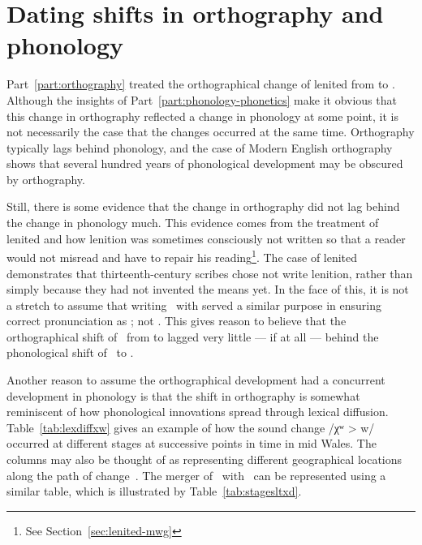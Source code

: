 \section{Dating shifts in orthography and phonology}
\label{sec:change-lenition-as}

Part~\ref{part:orthography} treated the orthographical change of lenited  from  to . Although the insights of Part~\ref{part:phonology-phonetics} make it obvious that this change in orthography reflected a change in phonology at some point, it is not necessarily the case that the changes occurred at the same time. Orthography typically lags behind phonology, and the case of Modern English orthography shows that several hundred years of phonological development may be obscured by orthography.

Still, there is some evidence that the change in orthography did not lag behind the change in phonology much. This evidence comes from the  treatment of lenited  and how lenition was sometimes consciously not written so that a reader would not misread and have to repair his reading\footnote{See Section~\ref{sec:lenited-mwg}}. The case of lenited  demonstrates that thirteenth-century scribes chose not write lenition, rather than simply because they had not invented the means yet. In the face of this, it is not a stretch to assume that writing \lT\ with  served a similar purpose in ensuring correct pronunciation as \lT; not \xD. This gives reason to believe that the orthographical shift of \lT\ from  to  lagged very little --- if at all --- behind the phonological shift of \lT\ to \xD.

Another reason to assume the orthographical development had a concurrent development in phonology is that the shift in orthography is somewhat reminiscent of how phonological innovations spread through lexical diffusion. Table~\ref{tab:lexdiffxw} gives an example of how the sound change /χʷ > w/  occurred at different stages at successive points in time in mid Wales. The columns may also be thought of as representing different geographical locations along the path of change~\autocite{Wil_Lexical05}. The merger of \lT\ with \xD\ can be represented using a similar table, which is illustrated by Table~\ref{tab:stagesltxd}.


